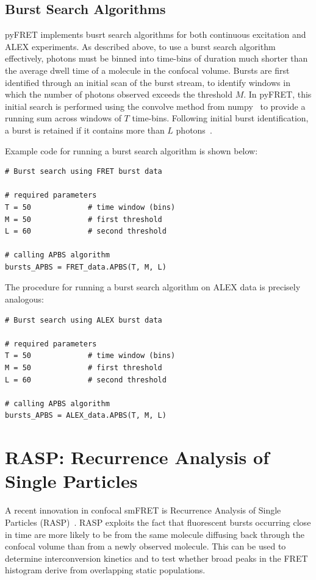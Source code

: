 \subsection{Burst Search Algorithms}
pyFRET implements busrt search algorithms for both continuous excitation and ALEX experiments. As described above, to use a burst search algorithm effectively, photons must be binned into time-bins of duration much shorter than the average dwell time of a molecule in the confocal volume. Bursts are first identified through an initial scan of the burst stream, to identify windows in which the number of photons observed exceeds the threshold $M$. In pyFRET, this initial search is performed using the convolve method from numpy~\cite{numpy11} to provide a running sum across windows of $T$ time-bins. Following initial burst identification, a burst is retained if it contains more than $L$ photons~\cite{nir06}.

Example code for running a burst search algorithm is shown below:

\begin{lstlisting}
# Burst search using FRET burst data

# required parameters
T = 50             # time window (bins)
M = 50             # first threshold
L = 60             # second threshold

# calling APBS algorithm
bursts_APBS = FRET_data.APBS(T, M, L)
\end{lstlisting}

The procedure for running a burst search algorithm on ALEX data is precisely analogous:

\begin{lstlisting}
# Burst search using ALEX burst data

# required parameters
T = 50             # time window (bins)
M = 50             # first threshold
L = 60             # second threshold

# calling APBS algorithm
bursts_APBS = ALEX_data.APBS(T, M, L)
\end{lstlisting}

\section{RASP: Recurrence Analysis of Single Particles}
A recent innovation in confocal smFRET is Recurrence Analysis of Single Particles (RASP)~\cite{hoffmann11}. RASP exploits the fact that fluorescent bursts occurring close in time are more likely to be from the same molecule diffusing back through the confocal volume than from a newly observed molecule. This can be used to determine interconversion kinetics and to test whether broad peaks in the FRET histogram derive from overlapping static populations.

